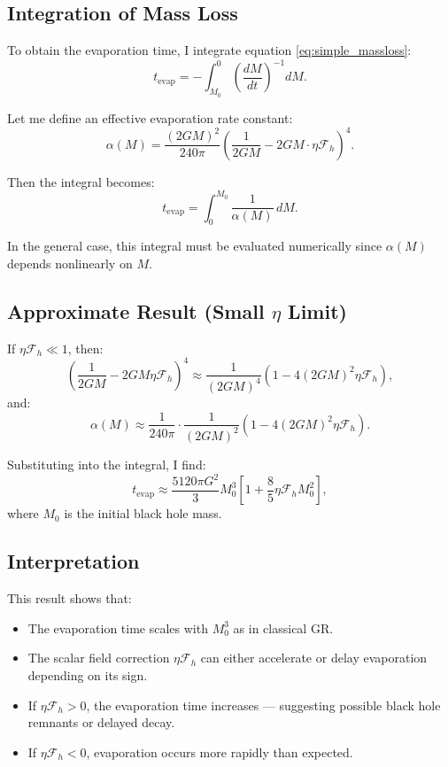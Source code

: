 \documentclass[12pt]{article}
\begin{document}
\subsection{Integration of Mass Loss}

To obtain the evaporation time, I integrate equation \eqref{eq:simple_massloss}:
\begin{equation}
t_{\text{evap}} = -\int_{M_0}^{0} \left( \frac{dM}{dt} \right)^{-1} dM.
\end{equation}

Let me define an effective evaporation rate constant:
\[
\alpha(M) = \frac{(2GM)^2}{240\pi} \left( \frac{1}{2GM} - 2GM \cdot \eta \mathcal{F}_h \right)^4.
\]

Then the integral becomes:
\begin{equation}
t_{\text{evap}} = \int_0^{M_0} \frac{1}{\alpha(M)} \, dM.
\end{equation}

In the general case, this integral must be evaluated numerically since \( \alpha(M) \) depends nonlinearly on \( M \).

\subsection{Approximate Result (Small \texorpdfstring{\( \eta \)}{eta} Limit)}

If \( \eta \mathcal{F}_h \ll 1 \), then:
\[
\left( \frac{1}{2GM} - 2GM \eta \mathcal{F}_h \right)^4 \approx \frac{1}{(2GM)^4} \left( 1 - 4 (2GM)^2 \eta \mathcal{F}_h \right),
\]
and:
\[
\alpha(M) \approx \frac{1}{240\pi} \cdot \frac{1}{(2GM)^2} \left( 1 - 4(2GM)^2 \eta \mathcal{F}_h \right).
\]

Substituting into the integral, I find:
\begin{equation}
t_{\text{evap}} \approx \frac{5120\pi G^2}{3} M_0^3 \left[ 1 + \frac{8}{5} \eta \mathcal{F}_h M_0^2 \right],
\end{equation}
where \( M_0 \) is the initial black hole mass.

\subsection{Interpretation}

This result shows that:
\begin{itemize}
    \item The evaporation time scales with \( M_0^3 \) as in classical GR.
    \item The scalar field correction \( \eta \mathcal{F}_h \) can either accelerate or delay evaporation depending on its sign.
    \item If \( \eta \mathcal{F}_h > 0 \), the evaporation time increases — suggesting possible black hole remnants or delayed decay.
    \item If \( \eta \mathcal{F}_h < 0 \), evaporation occurs more rapidly than expected.
\end{itemize}
\end{document}
